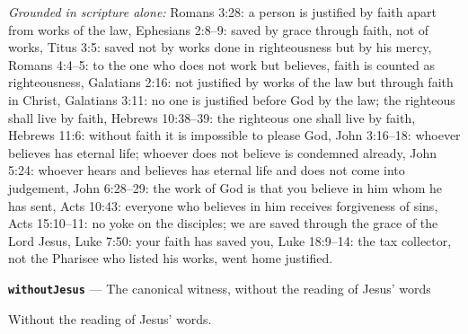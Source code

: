 \documentclass[11pt,paper=\testimonypaper,DIV=13,parskip=false]{scrartcl}
\begin{document}
\emph{Grounded in scripture alone:} Romans 3:28: a person is justified by faith apart from works of the law, Ephesians 2:8–9: saved by grace through faith, not of works, Titus 3:5: saved not by works done in righteousness but by his mercy, Romans 4:4–5: to the one who does not work but believes, faith is counted as righteousness, Galatians 2:16: not justified by works of the law but through faith in Christ, Galatians 3:11: no one is justified before God by the law; the righteous shall live by faith, Hebrews 10:38–39: the righteous one shall live by faith, Hebrews 11:6: without faith it is impossible to please God, John 3:16–18: whoever believes has eternal life; whoever does not believe is condemned already, John 5:24: whoever hears and believes has eternal life and does not come into judgement, John 6:28–29: the work of God is that you believe in him whom he has sent, Acts 10:43: everyone who believes in him receives forgiveness of sins, Acts 15:10–11: no yoke on the disciples; we are saved through the grace of the Lord Jesus, Luke 7:50: your faith has saved you, Luke 18:9–14: the tax collector, not the Pharisee who listed his works, went home justified.
\par\medskip\noindent\textbf{\texttt{without\allowbreak{}Jesus}} --- The canonical witness, without the reading of Jesus’ words\par\nobreak\noindent
Without the reading of Jesus’ words.
\end{document}
